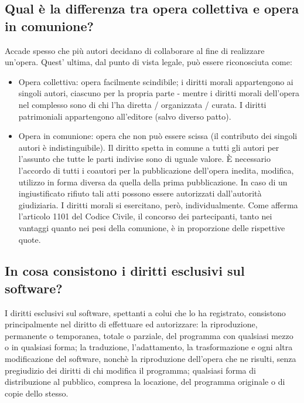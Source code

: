 \subsection{Qual è la differenza tra opera collettiva e opera in comunione?}
Accade spesso che più autori decidano di collaborare al fine di realizzare un'opera. Quest' ultima, dal punto
di vista legale, può essere riconosciuta come:
\begin{itemize}
    \item Opera collettiva: opera facilmente scindibile; i diritti morali appartengono ai singoli autori, ciascuno per la propria parte -
    mentre i diritti morali dell'opera nel complesso sono di chi l'ha diretta / organizzata / curata. \newline
    I diritti patrimoniali appartengono all'editore (salvo diverso patto).
    \item Opera in comunione: opera che non può essere scissa (il contributo dei singoli autori è indistinguibile).\newline
    Il diritto spetta in comune a tutti gli autori per l'assunto che tutte le parti indivise sono di uguale valore.\newline
    È necessario l'accordo di tutti i coautori per la pubblicazione dell'opera inedita, modifica, utilizzo in forma diversa
    da quella della prima pubblicazione. In caso di un ingiustificato rifiuto tali atti possono essere autorizzati dall'autorità giudiziaria.\newline
    I diritti morali si esercitano, però, individualmente. \newline
    Come afferma l'articolo 1101 del Codice Civile, il concorso dei partecipanti, tanto nei vantaggi quanto nei pesi della comunione,
    è in proporzione delle rispettive quote.
\end{itemize}

\subsection{In cosa consistono i diritti esclusivi sul software?}
I diritti esclusivi sul software, spettanti a colui che lo ha registrato, consistono principalmente nel diritto di effettuare ed
autorizzare: la riproduzione, permanente o temporanea, totale o parziale, del programma con qualsiasi mezzo o in qualsiasi forma;
la traduzione, l'adattamento, la trasformazione e ogni altra modificazione del software, nonchè la riproduzione dell'opera che ne
risulti, senza pregiudizio dei diritti di chi modifica il programma; qualsiasi forma di distribuzione al pubblico, compresa la locazione, del
programma originale o di copie dello stesso.

